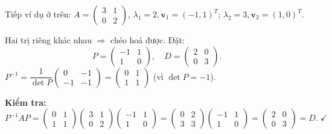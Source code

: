 \documentclass[12pt,a4paper]{article}
\begin{document}
\begin{vidu}[title={Chéo hoá ma trận trên}]
Tiếp ví dụ ở trên: $A = \begin{pmatrix}3 & 1\\ 0 & 2\end{pmatrix}$, $\lambda_1 = 2, \mathbf{v}_1 = (-1,1)^T$; $\lambda_2 = 3, \mathbf{v}_2 = (1,0)^T$.

Hai trị riêng khác nhau $\Rightarrow$ chéo hoá được. Đặt:
\[
  P = \begin{pmatrix}-1 & 1\\ 1 & 0\end{pmatrix},\quad D = \begin{pmatrix}2 & 0\\ 0 & 3\end{pmatrix}.
\]
$P^{-1} = \dfrac{1}{\det P}\begin{pmatrix}0 & -1\\ -1 & -1\end{pmatrix} = \begin{pmatrix}0 & 1\\ 1 & 1\end{pmatrix}$ (vì $\det P = -1$).

\textbf{Kiểm tra:}
\[
  P^{-1}AP = \begin{pmatrix}0 & 1\\ 1 & 1\end{pmatrix}\begin{pmatrix}3 & 1\\ 0 & 2\end{pmatrix}\begin{pmatrix}-1 & 1\\ 1 & 0\end{pmatrix} = \begin{pmatrix}0 & 2\\ 3 & 3\end{pmatrix}\begin{pmatrix}-1 & 1\\ 1 & 0\end{pmatrix} = \begin{pmatrix}2 & 0\\ 0 & 3\end{pmatrix} = D. \;\checkmark
\]
\end{vidu}
\end{document}
